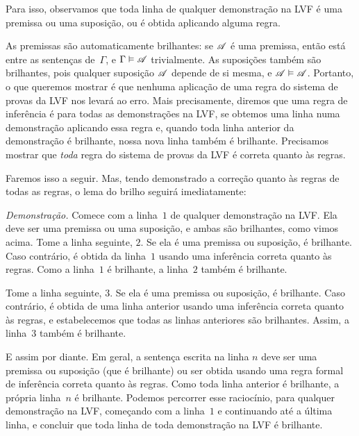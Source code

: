 Para isso, observamos que toda linha de qualquer demonstração na LVF é uma premissa ou uma suposição, ou é obtida aplicando alguma regra.

As premissas são automaticamente brilhantes: se $\mathscr{A}$ é uma premissa, então está entre as sentenças de~$\Gamma$, e $\Gamma \vDash \mathscr{A}$ trivialmente. As suposições também são brilhantes, pois qualquer suposição $\mathscr{A}$ depende de si mesma, e $\mathscr{A} \vDash \mathscr{A}$. Portanto, o que queremos mostrar é que nenhuma aplicação de uma regra do sistema de provas da LVF nos levará ao erro. Mais precisamente, diremos que uma regra de inferência é  \emph{\ifeff} para todas as demonstrações na LVF, se obtemos uma linha numa demonstração aplicando essa regra e, quando toda linha anterior da demonstração é brilhante, nossa nova linha também é brilhante. Precisamos mostrar que \emph{toda} regra do sistema de provas da LVF é correta quanto às regras.











Faremos isso a seguir. Mas, tendo demonstrado a correção quanto às regras de todas as regras, o lema do brilho seguirá imediatamente:

\emph{Demonstração.} Comece com a linha~$1$ de qualquer demonstração na LVF. Ela deve ser uma premissa ou uma suposição, e ambas são brilhantes, como vimos acima. Tome a linha seguinte, $2$. Se ela é uma premissa ou suposição, é brilhante. Caso contrário, é obtida da linha~$1$ usando uma inferência correta quanto às regras. Como a linha~$1$ é brilhante, a linha~$2$ também é brilhante.




Tome a linha seguinte, $3$. Se ela é uma premissa ou suposição, é brilhante. Caso contrário, é obtida de uma linha anterior usando uma inferência correta quanto às regras, e estabelecemos que todas as linhas anteriores são brilhantes. Assim, a linha~$3$ também é brilhante.



E assim por diante. Em geral, a sentença escrita na linha $n$ deve ser uma premissa ou suposição (que é brilhante) ou ser obtida usando uma regra formal de inferência correta quanto às regras. Como toda linha anterior é brilhante, a própria linha~$n$ é brilhante. Podemos percorrer esse raciocínio, para qualquer demonstração na LVF, começando com a linha~$1$ e continuando até a última linha, e concluir que toda linha de toda demonstração na LVF é brilhante.





